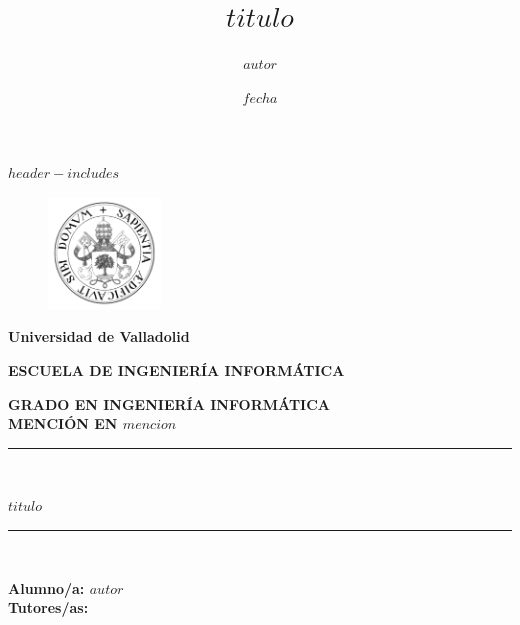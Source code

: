 $header-includes$

\date{$fecha$}
\author{$autor$}
\title{$titulo$}


    \begin{titlepage}
        \begin{center}
            \vspace*{-1in}
            \begin{figure}[htb]
                \begin{center}
                    \includegraphics[width=3cm]{./latex/img/logo}
                \end{center}
            \end{figure}
            \begin{large}
                \textbf{Universidad de Valladolid}
            \end{large}

            \vspace*{0.15in}
            \vspace*{0.6in}
            \begin{large}
                \textbf{ESCUELA DE INGENIERÍA INFORMÁTICA}
            \end{large}
            \vspace*{0.2in}
            \textbf{ GRADO EN INGENIERÍA INFORMÁTICA}\\
            \textbf{ MENCIÓN EN $mencion$ }
            \vspace*{0.5in}
            \rule{140mm}{0.1mm}\\
            \vspace*{0.3in}
            \begin{large}
                \textbf{{\LARGE $titulo$\\}}
            \end{large}
            \vspace*{0.6in}
            \rule{140mm}{0.1mm}\\
            \vspace*{2in}
            \begin{large}
                \begin{flushright}
                    \textbf{Alumno/a: $autor$ \\
                    \vspace*{0.3in}
                    Tutores/as: }
                \end{flushright}
            \end{large}
        \end{center}
    \end{titlepage}

